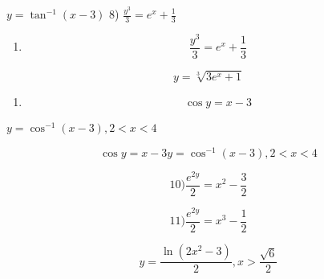 \documentclass[
]{article}
\providecommand{\tightlist}{%
  \setlength{\itemsep}{0pt}\setlength{\parskip}{0pt}}
\begin{document}
\(y = \tan^{-1}(x - 3)\) 8) \(\frac{y^3}{3} = e^x + \frac{1}{3}\)

\begin{enumerate}
\def\labelenumi{\arabic{enumi})}
\setcounter{enumi}{7}
\tightlist
\item
  \[\frac{y^3}{3} = e^x + \frac{1}{3}\]
\end{enumerate}

\[y = \sqrt[3]{3e^x + 1}\]

\begin{enumerate}
\def\labelenumi{\arabic{enumi})}
\setcounter{enumi}{8}
\tightlist
\item
  \[\cos y = x - 3\]
\end{enumerate}

\(y = \cos^{-1}(x - 3), 2 < x < 4\)

\[\cos y = x - 3 y = \cos^{-1}(x - 3), 2 < x < 4\]

\[10) \frac{e^{2y}}{2} = x^2 - \frac{3}{2}\]

\[11) \frac{e^{2y}}{2} = x^3 - \frac{1}{2}\]

\[y = \frac{\ln(2x^2 - 3)}{2}, x > \frac{\sqrt{6}}{2}\]
\end{document}
